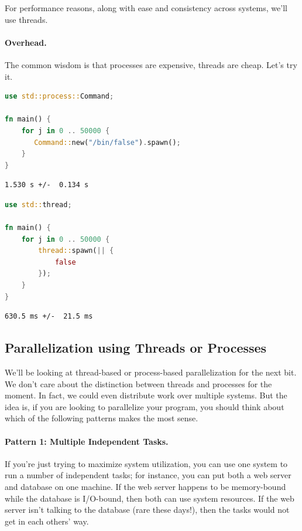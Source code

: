 \documentclass[a4paper]{report}
\begin{document}
For performance reasons, along with ease and consistency across systems, we'll use threads.

\paragraph{Overhead.} The common wisdom is that processes are
expensive, threads are cheap. Let's try it.

\begin{multicols}{2}

\begin{lstlisting}[language=Rust]
use std::process::Command;

fn main() {
    for j in 0 .. 50000 {
       Command::new("/bin/false").spawn();
    }
}
\end{lstlisting}
\begin{verbatim}
1.530 s +/-  0.134 s
\end{verbatim}
\columnbreak
\begin{lstlisting}[language=Rust]
use std::thread;

fn main() {
    for j in 0 .. 50000 {
        thread::spawn(|| {
            false
        });
    }
}
\end{lstlisting}
\begin{verbatim}
630.5 ms +/-  21.5 ms 
\end{verbatim}

\end{multicols}

\subsection*{Parallelization using Threads or Processes}
We'll be looking at thread-based or process-based parallelization for the
next bit. We don't care about the distinction between threads and processes
for the moment. In fact, we could even distribute work over multiple systems. But the idea is, if you are looking to parallelize your program, you should think about which of the following patterns makes the most sense.

\paragraph{Pattern 1: Multiple Independent Tasks.} If you're just trying to maximize
system utilization, you can use one system to run a number of independent
tasks; for instance, you can put both a web server and database on
one machine. If the web server happens to be memory-bound while the
database is I/O-bound, then both can use system resources. If the web
server isn't talking to the database (rare these days!), then the tasks
would not get in each others' way.
\end{document}
